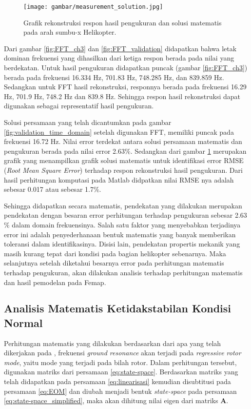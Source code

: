 \begin{figure}[H]
	\centering
	\texttt{[image: gambar/measurement\_solution.jpg]}
	\caption{Grafik rekonstruksi respon hasil pengukuran dan solusi matematis pada arah sumbu-x Helikopter.}
	\label{fig:measur_solution}
\end{figure}


Dari gambar \ref{fig:FFT_ch3} dan \ref{fig:FFT_validation} didapatkan bahwa letak dominan frekuensi yang dihasilkan dari ketiga respon berada pada nilai yang berdekatan. Untuk hasil pengukuran didapatkan puncak (gambar \ref{fig:FFT_ch3}) berada pada frekuensi 16.334 Hz, 701.83 Hz, 748.285 Hz, dan 839.859 Hz. Sedangkan untuk FFT hasil rekonstruksi, responnya berada pada frekuensi 16.29 Hz, 701.9 Hz, 748.2 Hz dan 839.8 Hz. Sehingga respon hasil rekonstruksi dapat digunakan sebagai representatif hasil pengukuran.

Solusi persamaan yang telah dicantumkan pada gambar \ref{fig:validation_time_domain} setelah digunakan FFT, memiliki puncak pada frekuensi 16.72 Hz. Nilai error terdekat antara solusi persamaan matematis dan pengukuran berada pada nilai error 2.63$\%$. Sedangkan dari gambar \ref{fig:measur_solution} merupakan grafik yang menampilkan grafik solusi matematis untuk identifikasi error RMSE (\textit{Root Mean Square Error}) terhadap respon rekonstruksi hasil pengukuran. Dari hasil perhitungan komputasi pada Matlab didpatkan nilai RMSE nya adalah sebesar 0.017 atau sebesar 1.7$\%$.

Sehingga didapatkan secara matematis, pendekatan yang dilakukan merupakan pendekatan dengan besaran error perhitungan terhadap pengukuran sebesar 2.63$\%$ dalam domain frekuensinya. Salah satu faktor yang menyebabkan terjadinya error ini adalah penyederhanaan bentuk matematis yang banyak memberikan toleransi dalam identifikasinya. Disisi lain, pendekatan propertis mekanik yang masih kurang tepat dari kondisi pada bagian helikopter sebenarnya. Maka selanjutnya setelah diketahui besarnya error pada perhitungan matematis terhadap pengukuran, akan dilakukan analisis terhadap perhitungan matematis dan hasil pemodelan pada Femap.

\subsection{Analisis Matematis Ketidakstabilan Kondisi Normal}

Perhitungan matematis yang dilakukan berdasarkan dari apa yang telah dikerjakan pada \cite{BERGEOT201672}, frekuensi \textit{ground resonance} akan terjadi pada \textit{regressive rotor mode}, yaitu mode yang terjadi pada bilah rotor. Dalam perhitungan tersebut, digunakan matriks dari persamaan \ref{eq:state-space}. Berdasarkan matriks yang telah didapatkan pada persamaan \ref{eq:linearisasi} kemudian disubtitusi pada persamaan \ref{eq:EOM} dan diubah menjadi bentuk \textit{state-space} pada persamaan \ref{eq:state-space_simplified}, maka akan dihitung nilai eigen dari matriks \textbf{A}.

